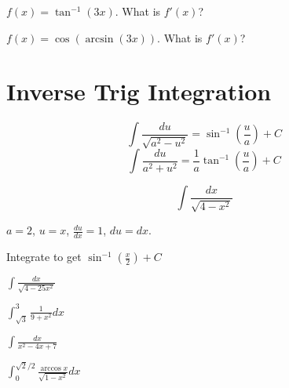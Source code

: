 \documentclass[../bccalc.tex]{subfiles}
\begin{document}
\ex $f(x)=\tan^{-1}(3x)$. What is $f'(x)$?

\ex $f(x)=\cos(\arcsin(3x))$. What is $f'(x)$?

\pagebreak
\section{Inverse Trig Integration}
\[ \int \frac{du}{\sqrt{a^2-u^2}}=\sin^{-1}\left(\frac{u}{a}\right)+C \]
\[ \int \frac{du}{a^2+u^2}=\frac{1}{a}\tan^{-1}\left(\frac{u}{a}\right)+C \]

\begin{example}
    \[ \int \frac{dx}{\sqrt{4-x^2}} \]

    $a=2$, $u=x$, $\frac{du}{dx}=1$, $du=dx$.

    Integrate to get $\sin^{-1}\left(\frac{x}{2}\right)+C$
\end{example}

\ex $\int \frac{dx}{\sqrt{4-25x^2}}$

\ex $\int_{\sqrt{3}}^3 \frac{1}{9+x^2}dx$

\ex $\int \frac{dx}{x^2-4x+7}$

\ex $\int_0^{\sqrt{2}/2}\frac{\arccos x}{\sqrt{1-x^2}}dx$
\end{document}
